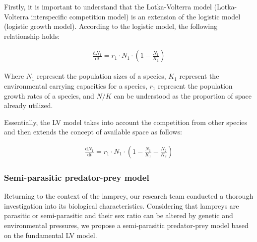 \documentclass[CTeX = true]{mcmthesis}  %
\begin{document}
Firstly, it is important to understand that the Lotka-Volterra model (Lotka-Volterra interspecific competition model) is an extension of the logistic model (logistic growth model). According to the logistic model, the following relationship holds:

\begin{equation}
\begin{aligned}
\frac{\mathrm{d} N_{1}}{\mathrm{d} t} = r_{1}\cdot N_{1}\cdot(1-\frac{N_{1}}{K_{1}})
\end{aligned}
\end{equation}

Where $N_{1}$ represent the population sizes of  a species, $K_{1}$ represent the environmental carrying capacities for  a species, $r_{1}$ represent the population growth rates of  a species, and $N/K$ can be understood as the proportion of space already utilized.

Essentially, the LV model takes into account the competition from other species and then extends the concept of available space as follows:

\begin{equation}
\begin{aligned}
\frac{\mathrm{d} N_{1}}{\mathrm{d} t} = r_{1}\cdot N_{1}\cdot(1-\frac{N_{1}}{K_{1}}-\frac{N_{2}}{K_{2}})
\end{aligned}
\end{equation}

\subsubsection{Semi-parasitic predator-prey model}
Returning to the context of the lamprey, our research team conducted a thorough investigation into its biological characteristics. Considering that lampreys are parasitic or semi-parasitic and their sex ratio can be altered by genetic and environmental pressures, we propose a semi-parasitic predator-prey model based on the fundamental LV model.
\end{document}
